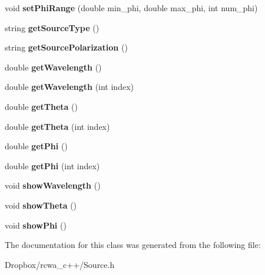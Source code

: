 \begin{DoxyCompactItemize}
\item 
void {\bfseries set\+Phi\+Range} (double min\+\_\+phi, double max\+\_\+phi, int num\+\_\+phi)\hypertarget{class_source_a78f140bb34eca1bb20de3cd9280fdd93}{}\label{class_source_a78f140bb34eca1bb20de3cd9280fdd93}

\item 
string {\bfseries get\+Source\+Type} ()\hypertarget{class_source_a8be2f63f7cbae82f4020941cc8dd1906}{}\label{class_source_a8be2f63f7cbae82f4020941cc8dd1906}

\item 
string {\bfseries get\+Source\+Polarization} ()\hypertarget{class_source_a0e3eeccbef16e9aad8a862590372724c}{}\label{class_source_a0e3eeccbef16e9aad8a862590372724c}

\item 
double {\bfseries get\+Wavelength} ()\hypertarget{class_source_a8f56f1ddaa0e28f3e13d362afcfed360}{}\label{class_source_a8f56f1ddaa0e28f3e13d362afcfed360}

\item 
double {\bfseries get\+Wavelength} (int index)\hypertarget{class_source_af740899e9ca4ba3655938e481117d119}{}\label{class_source_af740899e9ca4ba3655938e481117d119}

\item 
double {\bfseries get\+Theta} ()\hypertarget{class_source_a4c238bb4af3044ce4ef1b1dda6b02367}{}\label{class_source_a4c238bb4af3044ce4ef1b1dda6b02367}

\item 
double {\bfseries get\+Theta} (int index)\hypertarget{class_source_af4d4c6ea9f29a3df9698406dd28a815d}{}\label{class_source_af4d4c6ea9f29a3df9698406dd28a815d}

\item 
double {\bfseries get\+Phi} ()\hypertarget{class_source_ac1d8455934a08beb5a7d4d8897932579}{}\label{class_source_ac1d8455934a08beb5a7d4d8897932579}

\item 
double {\bfseries get\+Phi} (int index)\hypertarget{class_source_ae64f110086794de6b2f593ba8e12f6fe}{}\label{class_source_ae64f110086794de6b2f593ba8e12f6fe}

\item 
void {\bfseries show\+Wavelength} ()\hypertarget{class_source_a321a15a367d3c0d94e11c00a01d810bc}{}\label{class_source_a321a15a367d3c0d94e11c00a01d810bc}

\item 
void {\bfseries show\+Theta} ()\hypertarget{class_source_aafd6d9b282d4a5438eb8ad66cbbe77ed}{}\label{class_source_aafd6d9b282d4a5438eb8ad66cbbe77ed}

\item 
void {\bfseries show\+Phi} ()\hypertarget{class_source_a0c0adc6a0581e6bfbd8bbdd32d6ff0b4}{}\label{class_source_a0c0adc6a0581e6bfbd8bbdd32d6ff0b4}

\end{DoxyCompactItemize}


The documentation for this class was generated from the following file\+:\begin{DoxyCompactItemize}
\item 
Dropbox/rcwa\+\_\+c++/Source.\+h\end{DoxyCompactItemize}
